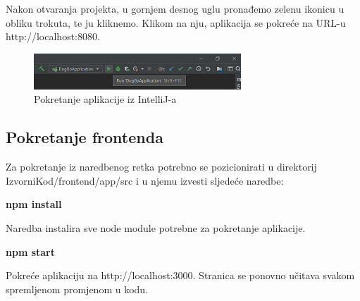         			Nakon otvaranja projekta, u gornjem desnog uglu pronađemo zelenu ikonicu u obliku trokuta, te ju kliknemo. Klikom na nju, aplikacija se pokreće na URL-u http://localhost:8080.
        			
        			 \begin{figure}[H]
        				\includegraphics[scale=1]{slike/deploy_runappide.PNG} 
        				\centering
        				\caption{Pokretanje aplikacije iz IntelliJ-a}
        				\label{fig:sustav-prvi-slucaj}
        			\end{figure}
        			
                \subsection{Pokretanje frontenda}
                
                Za pokretanje iz naredbenog retka potrebno se pozicionirati u direktorij IzvorniKod/frontend/app/src i u njemu izvesti sljedeće naredbe:

                \textbf{npm install}
                
                \noindent Naredba instalira sve node module potrebne za pokretanje aplikacije.\newline
                
                \textbf{npm start}
                
                \noindent Pokreće aplikaciju na http://localhost:3000.
                Stranica se ponovno učitava svakom spremljenom promjenom u kodu.

			
			
			\eject 
